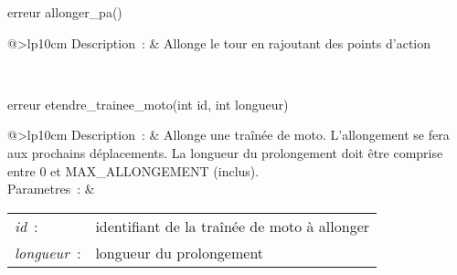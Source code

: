 \begin{minipage}{\linewidth}

\begin{lst-c++}
erreur allonger_pa()
\end{lst-c++}

\noindent
\begin{tabular}[t]{@{\extracolsep{0pt}}>{\bfseries}lp{10cm}}
Description~: & Allonge le tour en rajoutant des points d'action \\







\end{tabular} \\[0.3cm]
\end{minipage}


\begin{minipage}{\linewidth}

\begin{lst-c++}
erreur etendre_trainee_moto(int id, int longueur)
\end{lst-c++}

\noindent
\begin{tabular}[t]{@{\extracolsep{0pt}}>{\bfseries}lp{10cm}}
Description~: & Allonge une traînée de moto. L'allongement se fera aux prochains déplacements. La longueur du prolongement doit être comprise entre 0 et MAX\_ALLONGEMENT (inclus). \\


Parametres~: &
\begin{tabular}[t]{@{\extracolsep{0pt}}ll}
    
    
      
        \textsl{id}~: & identifiant de la traînée de moto à allonger \\
      
    
      
        \textsl{longueur}~: & longueur du prolongement \\
      
    
  \end{tabular} \\






\end{tabular} \\[0.3cm]
\end{minipage}


